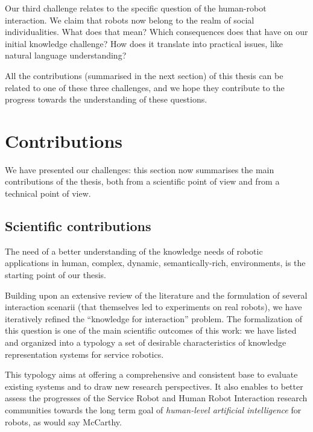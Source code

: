 Our third challenge relates to the specific question of the human-robot
interaction. We claim that robots now belong to the realm of social
individualities. What does that mean? Which consequences does that have on our
initial knowledge challenge? How does it translate into practical issues, like
natural language understanding?

All the contributions (summarised in the next section) of this thesis can be
related to one of these three challenges, and we hope they contribute to the
progress towards the understanding of these questions.



\section{Contributions}
\label{sect|contributions}

We have presented our challenges: this section now summarises the main
contributions of the thesis, both from a scientific point of view and from a
technical point of view.

\subsection{Scientific contributions}
\label{sect|scientific-contributions}

The need of a better understanding of the knowledge needs of robotic
applications in human, \ie complex, dynamic, semantically-rich, environments,
is the starting point of our thesis.

Building upon an extensive review of the literature and the formulation of
several interaction scenarii (that themselves led to experiments on real
robots), we have iteratively refined the ``knowledge for interaction'' problem.
The formalization of this question is one of the main scientific outcomes of
this work: we have listed and organized into a typology a set of desirable
characteristics of knowledge representation systems for service robotics.

This typology aims at offering a comprehensive and consistent base to evaluate
existing systems and to draw new research perspectives. It also enables to
better assess the progresses of the Service Robot and Human Robot Interaction
research communities towards the long term goal of \emph{human-level artificial
intelligence} for robots, as would say McCarthy.

